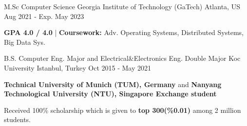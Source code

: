 \begin{cventries}
\vspace{2mm}
\cventry
    {M.Sc Computer Science } %
    {Georgia Institute of Technology (GaTech)} %
    {Atlanta, US} %
    {Aug 2021 - Exp. May 2023} %
    {\begin{cvghostitems} %
        \item {\textbf{GPA 4.0 / 4.0} | \textbf{Coursework:} Adv. Operating Systems, Distributed Systems, Big Data Sys. }
      \end{cvghostitems}
    }
\vspace{-1mm}
\vspace{-1mm}
\cvopenentry
    {B.S. Computer Eng. Major and Electrical\&Electronics Eng. Double Major} %
    {Koc University } %
    {Istanbul, Turkey} %
    {Oct 2015 - May 2021} %
    {\begin{cvghostitems} %
        \item {\textbf{Technical University of Munich (TUM), Germany} and \textbf{Nanyang Technological University (NTU), Singapore Exchange student 
        }}
        \item { Received 100\% scholarship which is given to \textbf{top 300(\%0.01)} among 2 million students.}
      \end{cvghostitems}
    }
\end{cventries}
